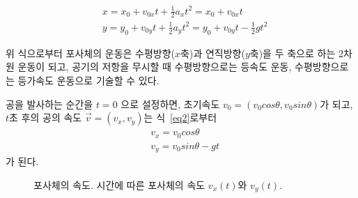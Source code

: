 \documentclass[12pt,a4paper]{article}
\begin{document}
\begin{equation}
    \begin{aligned}
        & x = x_{0} + v_{0x}t + \frac{1}{2}a_{x}t^2 = x_{0} + v_{0x}t \\
        & y = y_{0} + v_{0y}t + \frac{1}{2}a_{y}t^2 = y_{0} + v_{0y}t - \frac{1}{2}gt^2
    \end{aligned}
\end{equation}

위 식으로부터 포사체의 운동은 수평방향($x$축)과 연직방향($y$축)을 두 축으로 하는 2차원 운동이 되고,
공기의 저항을 무시할 때 수평방향으로는 등속도 운동, 수평방향으로는 등가속도 운동으로 기술할 수 있다.

공을 발사하는 순간을 $t = 0$ 으로 설정하면, 초기속도 $v_{0} = (v_{0}cos\theta, v_{0}sin\theta)$가 되고,
$t$초 후의 공의 속도 $\vec{v} = (v_x, v_y)$는 식~\ref{eq2}로부터
\begin{equation}
    \begin{aligned}
        & v_x = v_0 cos\theta \\
        & v_y = v_0 sin\theta - gt
        \label{eq4}
    \end{aligned}
\end{equation}
가 된다.
\begin{figure}[hbt!]
    \centering
    \begin{subfigure}[b]{0.4\linewidth}
    \end{subfigure}
    \begin{subfigure}[b]{0.4\linewidth}
    \end{subfigure}
    \caption{\label{fig2} 포사체의 속도. 시간에 따른 포사체의 속도 $v_x(t)$와 $v_y(t).$}
\end{figure}
\end{document}
